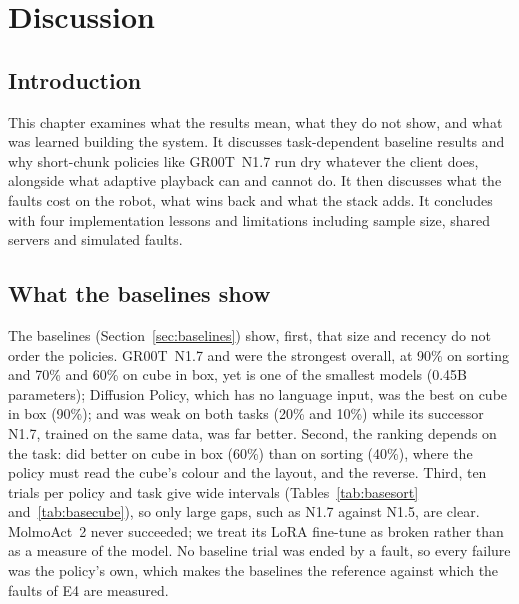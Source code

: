 \chapter{Discussion}\label{ch:discussion}

\section{Introduction}
This chapter examines what the results mean, what they do not show, and what was learned building the system. It discusses task-dependent baseline results and why short-chunk policies like GR00T~N1.7 run dry whatever the client does, alongside what adaptive playback can and cannot do. It then discusses what the faults cost on the robot, what \drtc{} wins back and what the stack adds. It concludes with four implementation lessons and limitations including sample size, shared servers and simulated faults.

\section{What the baselines show}
The baselines (Section~\ref{sec:baselines}) show, first, that size and recency do not order the policies. GR00T~N1.7
and \smolvla{} were the strongest overall, at 90\% on sorting and 70\% and 60\% on cube in box, yet \smolvla{} is one of the smallest
models (0.45B parameters); Diffusion Policy, which has no language input, was the best on cube in box (90\%); and
\groot{} was weak on both tasks (20\% and 10\%) while its successor N1.7, trained on the same data, was far better.
Second, the ranking depends on the task: \pizerofive{} did better on cube in box (60\%) than on sorting (40\%), where the
policy must read the cube's colour and the layout, and \smolvla{} the reverse. Third, ten trials per policy and task
give wide intervals (Tables~\ref{tab:basesort} and~\ref{tab:basecube}), so only large gaps, such as N1.7 against N1.5,
are clear. MolmoAct~2 never succeeded; we treat its LoRA fine-tune as broken rather than as a measure of the model. No
baseline trial was ended by a fault, so every failure was the policy's own, which makes the baselines the reference
against which the faults of E4 are measured.

